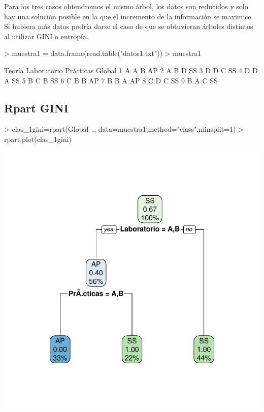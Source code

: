 \documentclass [a4paper] {article}
\begin{document}
Para los tres casos obtendremos el mismo árbol, los datos son reducidos y solo hay una solución posible en la que el incremento de la información se maximice.
Si hubiera más datos podría darse el caso de que se obtuvieran árboles distintos al utilizar GINI o entropía.
\begin{Schunk}
\begin{Sinput}
> muestra1 = data.frame(read.table("datos1.txt"))
> muestra1
\end{Sinput}
\begin{Soutput}
  Teoría Laboratorio Prácticas Global
1      A           A         B     AP
2      A           B         D     SS
3      D           D         C     SS
4      D           D         A     SS
5      B           C         B     SS
6      C           B         B     AP
7      B           B         A     AP
8      C           D         C     SS
9      B           A         C     SS
\end{Soutput}
\end{Schunk}

\newpage
\subsection{Rpart GINI}
\begin{center}
\begin{Schunk}
\begin{Sinput}
> clas_1gini=rpart(Global~., data=muestra1,method="class",minsplit=1)
> rpart.plot(clas_1gini)
\end{Sinput}
\end{Schunk}
\includegraphics{entrega-rpart1_gini}
\end{center}
\end{document}
